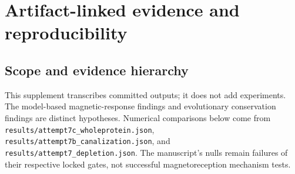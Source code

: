 \section{Artifact-linked evidence and reproducibility}
\subsection{Scope and evidence hierarchy}
This supplement transcribes committed outputs; it does not add experiments. The model-based magnetic-response findings and evolutionary conservation findings are distinct hypotheses. Numerical comparisons below come from \texttt{results/attempt7c\_wholeprotein.json}, \texttt{results/attempt7b\_canalization.json}, and \texttt{results/attempt7\_depletion.json}. The manuscript's nulls remain failures of their respective locked gates, not successful magnetoreception mechanism tests.
